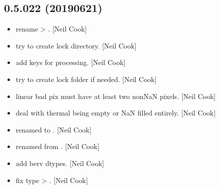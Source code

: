 \documentclass[a4paper,10pt,english]{report}
\begin{document}
\subsection{0.5.022 (2019\sphinxhyphen{}06\sphinxhyphen{}21)}
\label{\detokenize{misc/changelog:id134}}\begin{itemize}
\item {} 
 \sphinxhyphen{} rename  \textendash{}\textgreater{} . {[}Neil Cook{]}

\item {} 
 \sphinxhyphen{} try to create lock directory. {[}Neil Cook{]}

\item {} 
 \sphinxhyphen{} add keys for processing. {[}Neil Cook{]}

\item {} 
 \sphinxhyphen{} try to create lock folder if needed. {[}Neil Cook{]}

\item {} 
 \sphinxhyphen{} linear bad pix must have at least two non\sphinxhyphen{}NaN pixels.
{[}Neil Cook{]}

\item {} 
 \sphinxhyphen{} deal with thermal being empty or NaN filled entirely.
{[}Neil Cook{]}

\item {} 
 \sphinxhyphen{} renamed  to . {[}Neil
Cook{]}

\item {} 
 \sphinxhyphen{} renamed from . {[}Neil Cook{]}

\item {} 
 \sphinxhyphen{} add berv dtypes. {[}Neil Cook{]}

\item {} 
 \sphinxhyphen{} fix type  \textendash{}\textgreater{} . {[}Neil
Cook{]}

\end{itemize}
\end{document}
